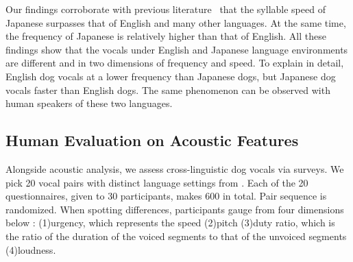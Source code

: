 Our findings corroborate with previous literature~\cite{doi:10.1126/sciadv.aaw2594, graham2014fundamental} that the syllable speed of Japanese surpasses that of English and many other languages. At the same time, the frequency of Japanese is relatively higher than that of English. All these findings show that the vocals under English and Japanese language environments are different and in two dimensions of frequency and speed. To explain in detail, English dog vocals at a lower frequency than Japanese dogs, but Japanese dog vocals faster than English dogs. The same phenomenon can be observed with human speakers of these two languages. %





\subsection{Human Evaluation on Acoustic Features}
Alongside acoustic analysis, we assess cross-linguistic dog vocals via surveys. We pick 20 vocal pairs with distinct language settings from . Each of the 20 questionnaires, given to 30 participants, makes 600 in total. Pair sequence is randomized. When spotting differences, participants gauge from four dimensions below%
: (1)urgency, which represents the speed (2)pitch (3)duty ratio, which is the ratio of the duration of the voiced segments to that of the unvoiced segments (4)loudness. 

